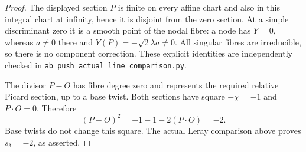 \begin{proof}
The displayed section $P$ is finite on every affine chart and
also in this integral chart at infinity, hence it is disjoint
from the zero section. At a simple discriminant zero it is a
smooth point of the nodal fibre: a node has $Y=0$, whereas
$a\ne0$ there and $Y(P)=-\sqrt2\lambda a\ne0$.
All singular fibres are irreducible, so there is no component
correction. These explicit identities are independently checked
in \texttt{ab\_push\_actual\_line\_comparison.py}.

The divisor $P-O$ has fibre degree zero and represents the
required relative Picard section, up to a base twist. Both
sections have square $-\chi=-1$ and $P\cdot O=0$. Therefore
\[
 (P-O)^2=-1-1-2(P\cdot O)=-2.
\]
Base twists do not change this square. The actual Leray
comparison above proves $s_\delta=-2$, as asserted.
\end{proof}
